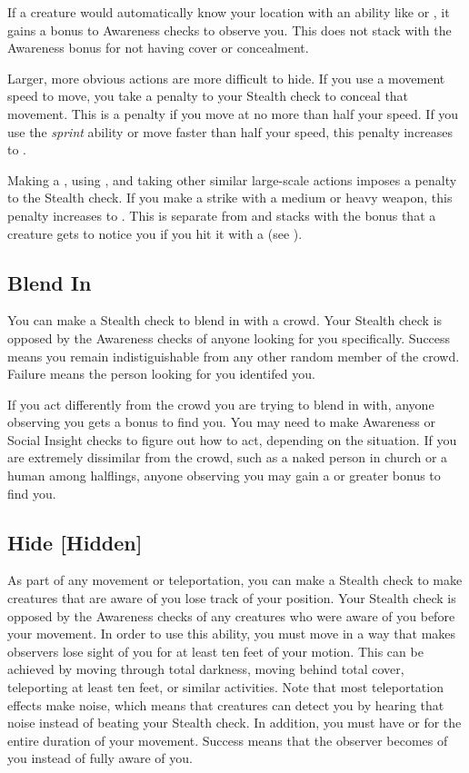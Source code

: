         If a creature would automatically know your location with an ability like  or , it gains a  bonus to Awareness checks to observe you.
        This does not stack with the Awareness bonus for not having cover or concealment.

        Larger, more obvious actions are more difficult to hide.
        If you use a movement speed to move, you take a penalty to your Stealth check to conceal that movement.
        This is a  penalty if you move at no more than half your speed.
        If you use the \textit{sprint} ability or move faster than half your speed, this penalty increases to .

        Making a , using , and taking other similar large-scale actions imposes a  penalty to the Stealth check.
        If you make a strike with a medium or heavy weapon, this penalty increases to .
        This is separate from and stacks with the  bonus that a creature gets to notice you if you hit it with a  (see ).

    \subsection{Blend In}
        You can make a Stealth check to blend in with a crowd. Your Stealth check is opposed by the Awareness checks of anyone looking for you specifically. Success means you remain indistiguishable from any other random member of the crowd. Failure means the person looking for you identifed you.

        If you act differently from the crowd you are trying to blend in with, anyone observing you gets a  bonus to find you. You may need to make Awareness or Social Insight checks to figure out how to act, depending on the situation. If you are extremely dissimilar from the crowd, such as a naked person in church or a human among halflings, anyone observing you may gain a  or greater bonus to find you.

    \subsection{Hide [Hidden]}\label{Hide}
        As part of any movement or teleportation, you can make a Stealth check to make creatures that are aware of you lose track of your position.
        Your Stealth check is opposed by the Awareness checks of any creatures who were aware of you before your movement.
        In order to use this ability, you must move in a way that makes observers lose sight of you for at least ten feet of your motion.
        This can be achieved by moving through total darkness, moving behind total cover, teleporting at least ten feet, or similar activities.
        Note that most teleportation effects make noise, which means that creatures can detect you by hearing that noise instead of beating your Stealth check.
        In addition, you must have  or  for the entire duration of your movement.
        Success means that the observer becomes \partiallyunaware of you instead of fully aware of you.

